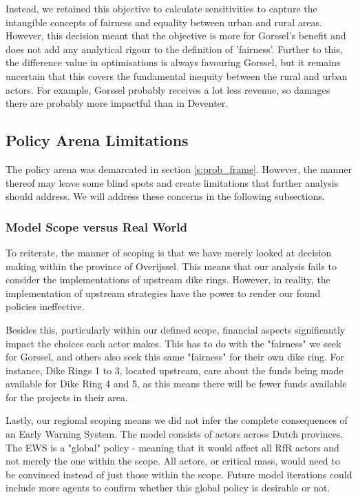 Instead, we retained this objective to calculate sensitivities to capture the intangible concepts of fairness and equality between urban and rural areas. However, this decision meant that the objective is more for Gorssel's benefit and does not add any analytical rigour to the definition of 'fairness'. Further to this, the difference value in optimisations is always favouring Gorssel, but it remains uncertain that this covers the fundamental inequity between the rural and urban actors. For example, Gorssel probably receives a lot less revenue, so damages there are probably more impactful than in Deventer.


\subsection{Policy Arena Limitations}

The policy arena was demarcated in section \ref{s:prob_frame}. However, the manner thereof may leave some blind spots and create limitations that further analysis should address. We will address these concerns in the following subsections.  

\subsubsection{Model Scope versus Real World}
To reiterate, the manner of scoping is that we have merely looked at decision making within the province of Overijssel. This means that our analysis fails to consider the implementations of upstream dike rings. However, in reality, the implementation of upstream strategies have the power to render our found policies ineffective. 

Besides this, particularly within our defined scope, financial aspects significantly impact the choices each actor makes. This has to do with the "fairness" we seek for Gorssel, and others also seek this same "fairness" for their own dike ring. For instance, Dike Rings 1 to 3, located upstream, care about the funds being made available for Dike Ring 4 and 5, as this means there will be fewer funds available for the projects in their area. 

Lastly, our regional scoping means we did not infer the complete consequences of an Early Warning System. The model consists of actors across Dutch provinces. The EWS is a "global" policy - meaning that it would affect all RfR actors and not merely the one within the scope. All actors, or critical mass, would need to be convinced instead of just those within the scope. Future model iterations could include more agents to confirm whether this global policy is desirable or not.


